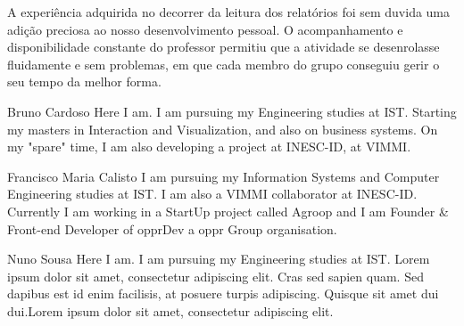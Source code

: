\documentclass[a4paper,12pt,journal,twoside,compsoc]{PPIEEEtran}
\begin{document}
A experiência adquirida no decorrer da leitura dos relatórios foi sem duvida uma adição preciosa ao nosso desenvolvimento pessoal. O acompanhamento e disponibilidade constante do professor permitiu que a atividade se desenrolasse fluidamente e sem problemas, em que cada membro do grupo conseguiu gerir o seu tempo da melhor forma.


%

% 
\begin{IEEEbiography}{Bruno Cardoso}
Here I am. I am pursuing my Engineering studies at \ac{IST}. Starting my masters in Interaction and Visualization, and also on business systems. On my "spare" time, I am also developing a project at INESC-ID, at VIMMI.
\end{IEEEbiography}
\begin{IEEEbiography}
{Francisco Maria Calisto}
I am pursuing my Information Systems and Computer  Engineering studies at \ac{IST}. I am also a VIMMI collaborator at INESC-ID. Currently I am working in a StartUp project called Agroop and I am Founder \& Front-end Developer of opprDev a oppr Group organisation.
\end{IEEEbiography}
\begin{IEEEbiography}
{Nuno Sousa}
Here I am. I am pursuing my Engineering studies at \ac{IST}. Lorem ipsum dolor sit amet, consectetur adipiscing elit. Cras sed sapien quam. Sed dapibus est id enim facilisis, at posuere turpis adipiscing. Quisque sit amet dui dui.Lorem ipsum dolor sit amet, consectetur adipiscing elit. 
\end{IEEEbiography}
\end{document}

